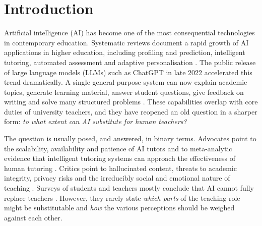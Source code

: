 \documentclass[pdflatex,sn-basic]{sn-jnl}%
\theoremstyle{plain}
\theoremstyle{remark}
\begin{document}
\section{Introduction}
\label{sec:intro}

Artificial intelligence (AI) has become one of the most consequential technologies in contemporary education. Systematic reviews document a rapid growth of AI applications in higher education, including profiling and prediction, intelligent tutoring, automated assessment and adaptive personalisation \citep{zawacki2019,crompton2023,bond2024}. The public release of large language models (LLMs) such as ChatGPT in late 2022 accelerated this trend dramatically. A single general-purpose system can now explain academic topics, generate learning material, answer student questions, give feedback on writing and solve many structured problems \citep{kasneci2023,dwivedi2023}. These capabilities overlap with core duties of university teachers, and they have reopened an old question in a sharper form: \emph{to what extent can AI substitute for human teachers?} \citep{selwyn2019,popenici2017}

The question is usually posed, and answered, in binary terms. Advocates point to the scalability, availability and patience of AI tutors and to meta-analytic evidence that intelligent tutoring systems can approach the effectiveness of human tutoring \citep{vanlehn2011,kulik2016}. Critics point to hallucinated content, threats to academic integrity, privacy risks and the irreducibly social and emotional nature of teaching \citep{rudolph2023,cotton2024,unesco2023}. Surveys of students and teachers mostly conclude that AI cannot fully replace teachers \citep{chantsi2024,chanhu2023}. However, they rarely state \emph{which parts} of the teaching role might be substitutable and \emph{how} the various perceptions should be weighed against each other.
\end{document}
